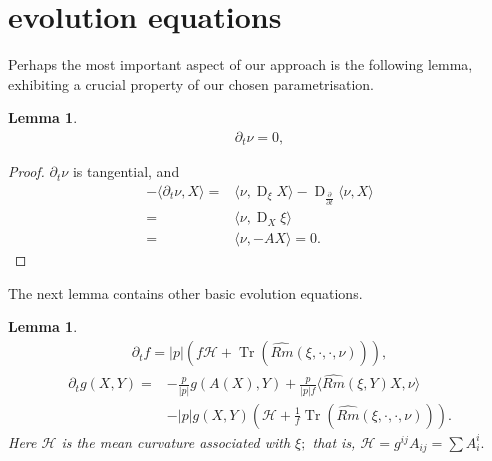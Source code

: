 \documentclass{amsart}
\newtheorem{lemma}[theorem]{Lemma}
\theoremstyle{definition}
\theoremstyle{remark}
\DeclareMathOperator{\Tr}{Tr}
\DeclareMathOperator{\D}{D}
\numberwithin{equation}{section}
\begin{document}
\section{evolution equations}

Perhaps the most important aspect of our approach is the following lemma, exhibiting a crucial property of our chosen parametrisation.

\begin{lemma}
\begin{align}
\partial_t\nu=0,
\end{align}
\end{lemma}

\begin{proof}
$\partial_t \nu$ is tangential, and
\begin{align*}
-\langle \partial_t\nu,X\rangle=&\langle \nu,\D_{\xi}X\rangle-\D_{\frac{\partial}{\partial t}}\langle \nu,X \rangle \\
=&\langle \nu,\D_{X}\xi\rangle\\
=&\langle \nu,-AX\rangle=0.
\end{align*}
\end{proof}

The next lemma contains other basic evolution equations.
\begin{lemma}
\begin{align}
\partial_t f = |p|(f\mathcal{H}+\Tr (\widehat{Rm}(\xi,\cdot,\cdot,\nu))),
\end{align}
\begin{align}
\partial_tg(X,Y)=&-\frac{p}{|p|}g(A(X),Y)+\frac{p}{|p|f}\langle \widehat{Rm}(\xi,Y)X,\nu\rangle\\
&-
|p|g(X,Y)(\mathcal{H}+\frac{1}{f}\Tr (\widehat{Rm}(\xi,\cdot,\cdot,\nu))).\nonumber
\end{align}
Here $\mathcal{H}$ is the mean curvature associated with $\xi;$ that is, $\mathcal{H}=g^{ij} A _{ij}=\sum  A _i^i.$
\end{lemma}
\end{document}
